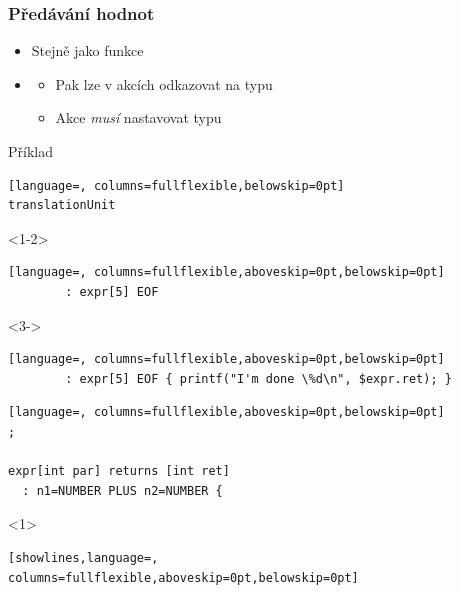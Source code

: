 \begin{frame}[fragile]
  \frametitle{Předávání hodnot}

  \begin{itemize}
    \item Stejně jako funkce
    \item {}

    \pause

    \begin{itemize}
      \item Pak lze v akcích odkazovat na  typu 
      \pause
      \item Akce \emph{musí} nastavovat  typu 
    \end{itemize}
  \end{itemize}

  \begin{block}{Příklad}
  \begin{lstlisting}[language=, columns=fullflexible,belowskip=0pt]
translationUnit
  \end{lstlisting}
  \begin{onlyenv}<1-2>
  \begin{lstlisting}[language=, columns=fullflexible,aboveskip=0pt,belowskip=0pt]
        : expr[5] EOF
  \end{lstlisting}
  \end{onlyenv}
  \begin{onlyenv}<3->
  \begin{lstlisting}[language=, columns=fullflexible,aboveskip=0pt,belowskip=0pt]
        : expr[5] EOF { printf("I'm done \%d\n", $expr.ret); }
  \end{lstlisting}
  \end{onlyenv}
  \begin{lstlisting}[language=, columns=fullflexible,aboveskip=0pt,belowskip=0pt]
;

expr[int par] returns [int ret]
  : n1=NUMBER PLUS n2=NUMBER {
  \end{lstlisting}
  \begin{onlyenv}<1>
  \begin{lstlisting}[showlines,language=, columns=fullflexible,aboveskip=0pt,belowskip=0pt]


\end{lstlisting}
\end{onlyenv}
\end{block}
\end{frame}
